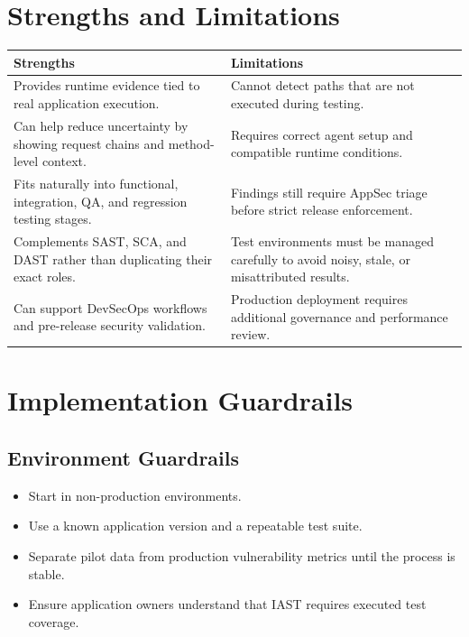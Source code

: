 \documentclass[11pt]{article}
\begin{document}
\section{Strengths and Limitations}

\begin{center}
\begin{tabularx}{\linewidth}{Y Y}
\toprule
\textbf{Strengths} & \textbf{Limitations} \\
\midrule
Provides runtime evidence tied to real application execution. & Cannot detect paths that are not executed during testing. \\
Can help reduce uncertainty by showing request chains and method-level context. & Requires correct agent setup and compatible runtime conditions. \\
Fits naturally into functional, integration, QA, and regression testing stages. & Findings still require AppSec triage before strict release enforcement. \\
Complements SAST, SCA, and DAST rather than duplicating their exact roles. & Test environments must be managed carefully to avoid noisy, stale, or misattributed results. \\
Can support DevSecOps workflows and pre-release security validation. & Production deployment requires additional governance and performance review. \\
\bottomrule
\end{tabularx}
\end{center}

\section{Implementation Guardrails}

\subsection{Environment Guardrails}

\begin{itemize}
  \item Start in non-production environments.
  \item Use a known application version and a repeatable test suite.
  \item Separate pilot data from production vulnerability metrics until the process is stable.
  \item Ensure application owners understand that IAST requires executed test coverage.
\end{itemize}
\end{document}
